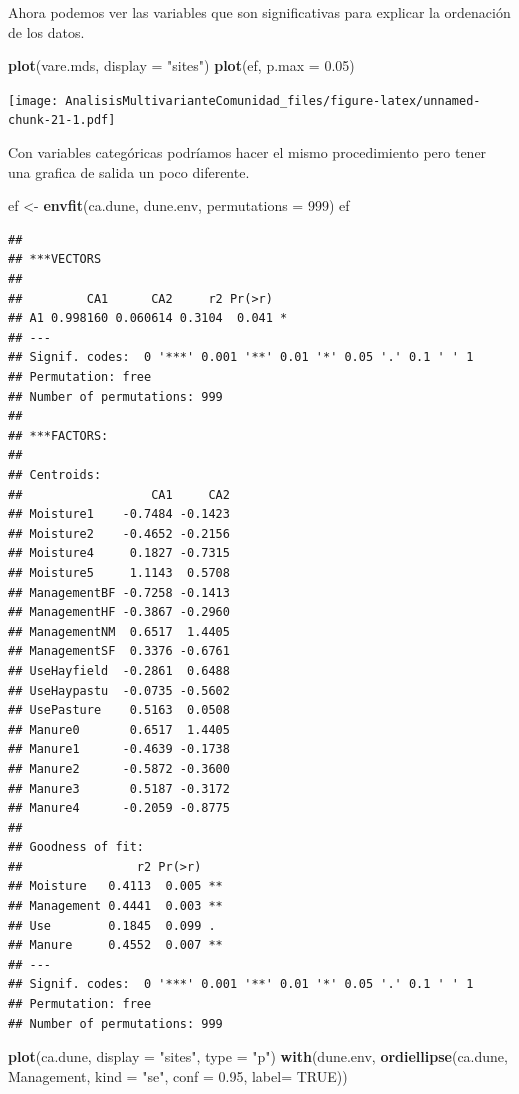 \documentclass[]{book}
\newenvironment{Shaded}{\begin{snugshade}}{\end{snugshade}}
\newcommand{\KeywordTok}[1]{\textcolor[rgb]{0.13,0.29,0.53}{\textbf{{#1}}}}
\newcommand{\DataTypeTok}[1]{\textcolor[rgb]{0.13,0.29,0.53}{{#1}}}
\newcommand{\DecValTok}[1]{\textcolor[rgb]{0.00,0.00,0.81}{{#1}}}
\newcommand{\FloatTok}[1]{\textcolor[rgb]{0.00,0.00,0.81}{{#1}}}
\newcommand{\StringTok}[1]{\textcolor[rgb]{0.31,0.60,0.02}{{#1}}}
\newcommand{\OtherTok}[1]{\textcolor[rgb]{0.56,0.35,0.01}{{#1}}}
\newcommand{\NormalTok}[1]{{#1}}
\begin{document}
Ahora podemos ver las variables que son significativas para explicar la
ordenación de los datos.

\begin{Shaded}
\begin{Highlighting}[]
\KeywordTok{plot}\NormalTok{(vare.mds, }\DataTypeTok{display =} \StringTok{"sites"}\NormalTok{)}
\KeywordTok{plot}\NormalTok{(ef, }\DataTypeTok{p.max =} \FloatTok{0.05}\NormalTok{)}
\end{Highlighting}
\end{Shaded}

\texttt{[image: AnalisisMultivarianteComunidad\_files/figure-latex/unnamed-chunk-21-1.pdf]}

Con variables categóricas podríamos hacer el mismo procedimiento pero
tener una grafica de salida un poco diferente.

\begin{Shaded}
\begin{Highlighting}[]
\NormalTok{ef <-}\StringTok{ }\KeywordTok{envfit}\NormalTok{(ca.dune, dune.env, }\DataTypeTok{permutations =} \DecValTok{999}\NormalTok{)}
\NormalTok{ef}
\end{Highlighting}
\end{Shaded}

\begin{verbatim}
## 
## ***VECTORS
## 
##         CA1      CA2     r2 Pr(>r)  
## A1 0.998160 0.060614 0.3104  0.041 *
## ---
## Signif. codes:  0 '***' 0.001 '**' 0.01 '*' 0.05 '.' 0.1 ' ' 1
## Permutation: free
## Number of permutations: 999
## 
## ***FACTORS:
## 
## Centroids:
##                  CA1     CA2
## Moisture1    -0.7484 -0.1423
## Moisture2    -0.4652 -0.2156
## Moisture4     0.1827 -0.7315
## Moisture5     1.1143  0.5708
## ManagementBF -0.7258 -0.1413
## ManagementHF -0.3867 -0.2960
## ManagementNM  0.6517  1.4405
## ManagementSF  0.3376 -0.6761
## UseHayfield  -0.2861  0.6488
## UseHaypastu  -0.0735 -0.5602
## UsePasture    0.5163  0.0508
## Manure0       0.6517  1.4405
## Manure1      -0.4639 -0.1738
## Manure2      -0.5872 -0.3600
## Manure3       0.5187 -0.3172
## Manure4      -0.2059 -0.8775
## 
## Goodness of fit:
##                r2 Pr(>r)   
## Moisture   0.4113  0.005 **
## Management 0.4441  0.003 **
## Use        0.1845  0.099 . 
## Manure     0.4552  0.007 **
## ---
## Signif. codes:  0 '***' 0.001 '**' 0.01 '*' 0.05 '.' 0.1 ' ' 1
## Permutation: free
## Number of permutations: 999
\end{verbatim}

\begin{Shaded}
\begin{Highlighting}[]
\KeywordTok{plot}\NormalTok{(ca.dune, }\DataTypeTok{display =} \StringTok{"sites"}\NormalTok{, }\DataTypeTok{type =} \StringTok{"p"}\NormalTok{)}
\KeywordTok{with}\NormalTok{(dune.env, }\KeywordTok{ordiellipse}\NormalTok{(ca.dune, Management, }\DataTypeTok{kind =} \StringTok{"se"}\NormalTok{, }\DataTypeTok{conf =} \FloatTok{0.95}\NormalTok{, }\DataTypeTok{label=} \OtherTok{TRUE}\NormalTok{))}
\end{Highlighting}
\end{Shaded}
\end{document}
